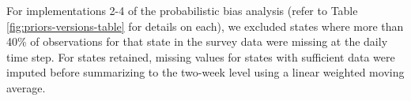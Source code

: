 \documentclass[12pt,twoside]{smiththesis}
\begin{document}
For implementations 2-4 of the probabilistic bias analysis (refer to Table \ref{fig:priors-versions-table} for details on each), we excluded states where more than 40\% of observations for that state in the survey data were missing at the daily time step. For states retained, missing values for states with sufficient data were imputed before summarizing to the two-week level using a linear weighted moving average.

~

~

~

~

~

~

~

~

~

~

~

~

~
\end{document}
